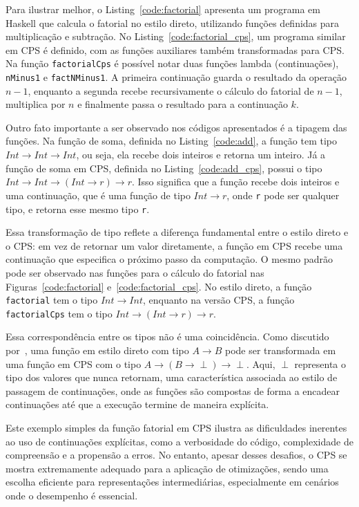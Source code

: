 



Para ilustrar melhor, o Listing~\ref{code:factorial} apresenta um programa em Haskell que calcula o fatorial no estilo direto, utilizando funções definidas para multiplicação e subtração.
No Listing~\ref{code:factorial_cps}, um programa similar em CPS é definido, com as funções auxiliares também transformadas para CPS\@.
Na função \texttt{factorialCps} é possível notar duas funções lambda (continuações), \texttt{nMinus1} e \texttt{factNMinus1}.
A primeira continuação guarda o resultado da operação $n - 1$, enquanto a segunda recebe recursivamente o cálculo do fatorial de $n - 1$, multiplica por $n$ e finalmente passa o resultado para a continuação $k$.

Outro fato importante a ser observado nos códigos apresentados é a tipagem das funções.
Na função de soma, definida no Listing~\ref{code:add}, a função tem tipo $Int \rightarrow Int \rightarrow Int$, ou seja, ela recebe dois inteiros e retorna um inteiro.
Já a função de soma em CPS, definida no Listing~\ref{code:add_cps}, possui o tipo $Int \rightarrow Int \rightarrow (Int \rightarrow r) \rightarrow r$. Isso significa que a função recebe dois inteiros e uma continuação, que é uma função de tipo $Int \rightarrow r$, onde \texttt{r} pode ser qualquer tipo, e retorna esse mesmo tipo \texttt{r}.

Essa transformação de tipo reflete a diferença fundamental entre o estilo direto e o CPS\@: em vez de retornar um valor diretamente, a função em CPS recebe uma continuação que especifica o próximo passo da computação.
O mesmo padrão pode ser observado nas funções para o cálculo do fatorial nas Figuras~\ref{code:factorial} e~\ref{code:factorial_cps}.
No estilo direto, a função \texttt{factorial} tem o tipo $Int \rightarrow Int$, enquanto na versão CPS, a função \texttt{factorialCps} tem o tipo $Int \rightarrow (Int \rightarrow r) \rightarrow r$.

Essa correspondência entre os tipos não é uma coincidência.
Como discutido por~, uma função em estilo direto com tipo $A \rightarrow B$ pode ser transformada em uma função em CPS com o tipo $A \rightarrow (B \rightarrow \perp) \rightarrow \perp$.
Aqui, $\perp$ representa o tipo dos valores que nunca retornam, uma característica associada ao estilo de passagem de continuações, onde as funções são compostas de forma a encadear continuações até que a execução termine de maneira explícita.

Este exemplo simples da função fatorial em CPS ilustra as dificuldades inerentes ao uso de continuações explícitas, como a verbosidade do código, complexidade de compreensão e a propensão a erros.
No entanto, apesar desses desafios, o CPS se mostra extremamente adequado para a aplicação de otimizações, sendo uma escolha eficiente para representações intermediárias, especialmente em cenários onde o desempenho é essencial.
